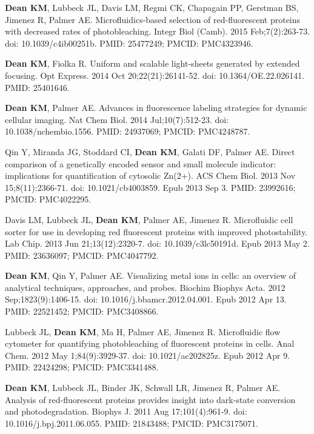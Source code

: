 \begin{etaremune}
\item \textbf{Dean KM}, Lubbeck JL, Davis LM, Regmi CK, Chapagain PP, Gerstman BS, Jimenez R, Palmer AE. Microfluidics-based selection of red-fluorescent proteins with decreased rates of photobleaching. Integr Biol (Camb). 2015 Feb;7(2):263-73. doi: 10.1039/c4ib00251b. PMID: 25477249; PMCID: PMC4323946.

\item \textbf{Dean KM}, Fiolka R. Uniform and scalable light-sheets generated by extended focusing. Opt Express. 2014 Oct 20;22(21):26141-52. doi: 10.1364/OE.22.026141. PMID: 25401646.

\item \textbf{Dean KM}, Palmer AE. Advances in fluorescence labeling strategies for dynamic cellular imaging. Nat Chem Biol. 2014 Jul;10(7):512-23. doi: 10.1038/nchembio.1556. PMID: 24937069; PMCID: PMC4248787.

\item Qin Y, Miranda JG, Stoddard CI, \textbf{Dean KM}, Galati DF, Palmer AE. Direct comparison of a genetically encoded sensor and small molecule indicator: implications for quantification of cytosolic Zn(2+). ACS Chem Biol. 2013 Nov 15;8(11):2366-71. doi: 10.1021/cb4003859. Epub 2013 Sep 3. PMID: 23992616; PMCID: PMC4022295.

\item Davis LM, Lubbeck JL, \textbf{Dean KM}, Palmer AE, Jimenez R. Microfluidic cell sorter for use in developing red fluorescent proteins with improved photostability. Lab Chip. 2013 Jun 21;13(12):2320-7. doi: 10.1039/c3lc50191d. Epub 2013 May 2. PMID: 23636097; PMCID: PMC4047792.

\item \textbf{Dean KM}, Qin Y, Palmer AE. Visualizing metal ions in cells: an overview of analytical techniques, approaches, and probes. Biochim Biophys Acta. 2012 Sep;1823(9):1406-15. doi: 10.1016/j.bbamcr.2012.04.001. Epub 2012 Apr 13. PMID: 22521452; PMCID: PMC3408866.

\item Lubbeck JL, \textbf{Dean KM}, Ma H, Palmer AE, Jimenez R. Microfluidic flow cytometer for quantifying photobleaching of fluorescent proteins in cells. Anal Chem. 2012 May 1;84(9):3929-37. doi: 10.1021/ac202825z. Epub 2012 Apr 9. PMID: 22424298; PMCID: PMC3341488.

\item \textbf{Dean KM}, Lubbeck JL, Binder JK, Schwall LR, Jimenez R, Palmer AE. Analysis of red-fluorescent proteins provides insight into dark-state conversion and photodegradation. Biophys J. 2011 Aug 17;101(4):961-9. doi: 10.1016/j.bpj.2011.06.055. PMID: 21843488; PMCID: PMC3175071.


\end{etaremune}
